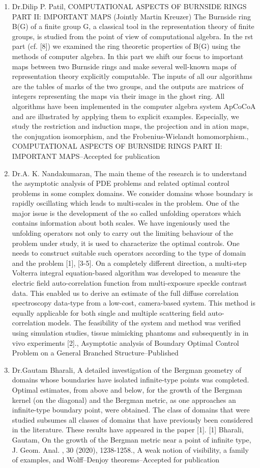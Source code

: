 \begin{enumerate}
\item Dr.Dilip P. Patil, COMPUTATIONAL ASPECTS OF BURNSIDE RINGS PART II: IMPORTANT MAPS (Jointly Martin  Kreuzer)   The Burnside ring B(G) of a finite group G, a classical tool in the representation theory of finite groups, is studied from the point of view of computational algebra. In the rst part (cf. [8]) we examined the ring theoretic properties of B(G) using the methods of computer algebra. In this part we shift our focus to important maps between two Burnside rings and make several well-known maps of representation theory explicitly computable. The inputs of all our algorithms are the tables of marks of the two groups, and the outputs are matrices of integers representing the maps via their image in the ghost ring. All algorithms have been implemented in the computer algebra system ApCoCoA and are illustrated by applying them to explicit examples. Especially, we study the restriction and induction maps, the projection and in ation maps, the conjugation isomorphism, and the Frobenius-Wielandt homomorphism., COMPUTATIONAL ASPECTS OF BURNSIDE RINGS PART II: IMPORTANT MAPS--Accepted for publication
\item Dr.A. K. Nandakumaran, The main theme of the research is to understand the asymptotic analysis of  PDE problems and related optimal control problems in some complex domains. We consider domains whose boundary is rapidly oscillating which  leads to multi-scales in the problem. One of the major issue is the development of the so called unfolding operators which contains information about both scales. We have ingeniously used the unfolding operators not only to carry out the limiting behaviour of the problem under study, it is used to characterize the optimal controls. One needs to construct suitable such operators according to the type of domain and the problem [1], [3-5]. On a completely different direction, a multi-step Volterra integral equation-based algorithm was developed to measure the electric field auto-correlation function from multi-exposure speckle contrast data. This enabled us to derive an estimate of the full diffuse correlation spectroscopy data-type from a low-cost, camera-based system. This method is equally applicable for both single and multiple scattering field auto-correlation models. The feasibility of the system and method was verified using simulation studies, tissue mimicking phantoms and subsequently in in vivo experiments [2]., Asymptotic analysis of Boundary Optimal Control Problem on a General Branched Structure--Published
\item Dr.Gautam Bharali, A detailed investigation of the Bergman geometry of domains whose boundaries have isolated infinite-type points was completed. Optimal estimates, from above and below, for the growth of the Bergman kernel (on the diagonal) and the Bergman metric, as one approaches an infinite-type boundary point, were obtained. The class of domains that were studied subsumes all classes of domains that have previously been considered in the literature. These results have appeared in the paper [1].  [1] Bharali, Gautam, On the growth of the Bergman metric near a point of infinite type, J. Geom. Anal. , 30 (2020), 1238-1258., A weak notion of visibility, a family of examples, and Wolff--Denjoy theorems--Accepted for publication

\end{enumerate}
